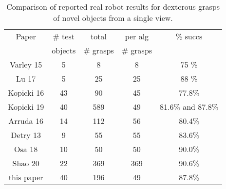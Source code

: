 \begin{table}[t]
\small
\begin{center}
\caption{Comparison of reported real-robot results for dexterous grasps of novel objects from a single view. \label{tab:robot-results-comparison}}
\begin{tabular}{|c|c|c|c|c|} \hline
Paper & \# test   & total         & per alg     & \% succs \\ \
           & objects & \# grasps & \# grasps &              \\ \hline
Varley 15 \cite{varley2015generating} & 5  & 8 & 8  & 75 \%\\
Lu  17 \cite{lu2017planning} & 5 & 25  & 25 & 88  \% \\
Kopicki 16 \cite{kopicki2015ijrr} & 43 & 90  & 45 & 77.8\% \\
Kopicki 19 \cite{kopicki2019ijrr} & 40 & 589  & 49 & 81.6\% and 87.8\% \\
Arruda 16 \cite{arruda2016active} & 14 & 112 & 56 & 80.4\% \\
Detry 13 \cite{detry2013a} & 9 & 55 & 55 & 83.6\% \\
Osa 18  \cite{Osa2018} & 10  & 50 & 50 & 90.0\%\\
Shao 20 \cite{Shao2020} & 22 & 369 & 369 & 90.6\% \\
this paper  & 40 & 196 & 49 & 87.8\% \\
\hline
\end{tabular}
\end{center}
\end{table}
